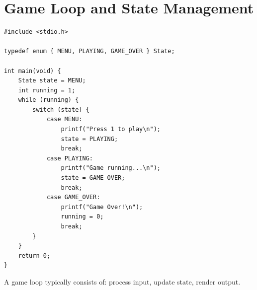 \documentclass[11pt,a4paper]{article}
\begin{document}
\section{Game Loop and State Management}
\begin{lstlisting}
#include <stdio.h>

typedef enum { MENU, PLAYING, GAME_OVER } State;

int main(void) {
    State state = MENU;
    int running = 1;
    while (running) {
        switch (state) {
            case MENU:
                printf("Press 1 to play\n");
                state = PLAYING;
                break;
            case PLAYING:
                printf("Game running...\n");
                state = GAME_OVER;
                break;
            case GAME_OVER:
                printf("Game Over!\n");
                running = 0;
                break;
        }
    }
    return 0;
}
\end{lstlisting}

A game loop typically consists of: process input, update state, render output.
\end{document}
